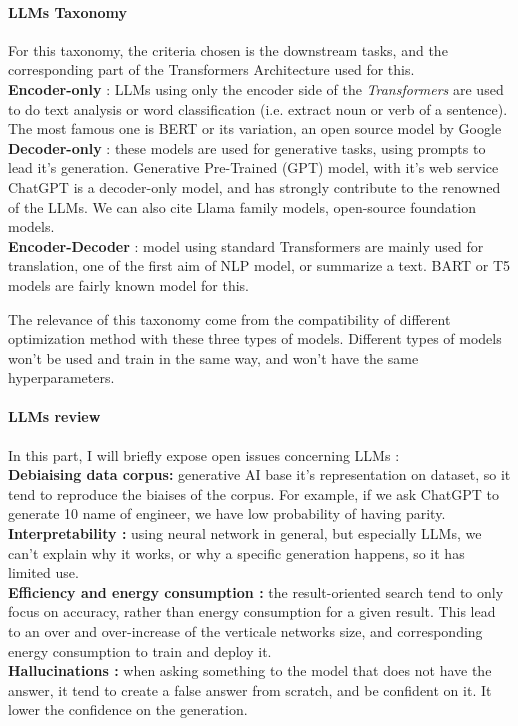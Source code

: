 \paragraph{LLMs Taxonomy}
For this taxonomy, the criteria chosen is the downstream tasks, and the corresponding part of the Transformers Architecture used for this.\\
\textbf{Encoder-only} : LLMs using only the encoder side of the \textit{Transformers} are used to do text analysis or word classification (i.e. extract noun or verb of a sentence). The most famous one is BERT\cite{devlin_bert_2019} or its variation, an open source model by Google\\
\textbf{Decoder-only} : these models are used for generative tasks, using prompts to lead it's generation. 
Generative Pre-Trained (GPT) model, with it's web service ChatGPT \cite{ChatGPT} is a decoder-only model, and has strongly contribute to the renowned of the LLMs. We can also cite Llama \cite{dubey2024llama} family models, open-source foundation models.\\
\textbf{Encoder-Decoder} : model using standard Transformers are mainly used for translation, one of the first aim of NLP model, or summarize a text. BART or T5 models are fairly known model for this.

The relevance of this taxonomy come from the compatibility of different optimization method with these three types of models. Different types of models won't be used and train in the same way, and won't have the same hyperparameters. 

\paragraph{LLMs review}
In this part, I will briefly expose open issues concerning LLMs : \\
\textbf{Debiaising data corpus:} generative AI base it's representation on dataset, so it tend to reproduce the biaises of the corpus. For example, if we ask ChatGPT to generate 10 name of engineer, we have low probability of having parity.\\
\textbf{Interpretability :} using neural network in general, but especially LLMs, we can't explain why it works, or why a specific generation happens, so it has limited use.\\
\textbf{Efficiency and energy consumption :} the result-oriented search tend to only focus on accuracy, rather than energy consumption for a given result. This lead to an over and over-increase of the verticale networks size, and corresponding energy consumption to train and deploy it.\\
\textbf{Hallucinations\cite{chatgpt_hallucinations} :} when asking something to the model that does not have the answer, it tend to create a false answer from scratch, and be confident on it. It lower the confidence on the generation. 


